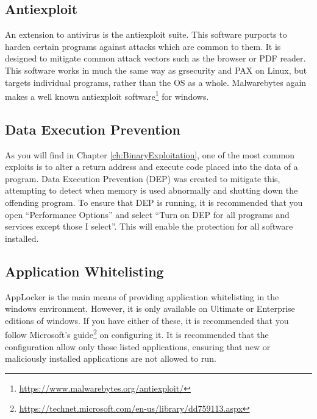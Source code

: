 \documentclass[a4paper,11pt]{report}
\begin{document}
		\subsection{Antiexploit}
			An extension to antivirus is the antiexploit suite. 
			This software purports to harden certain programs against attacks which are common to them. 
			It is designed to mitigate common attack vectors such as the browser or PDF reader. 
			This software works in much the same way as grsecurity and PAX on Linux, but targets individual programs, rather than the OS as a whole. 
			Malwarebytes again makes a well known antiexploit software\footnote{\url{https://www.malwarebytes.org/antiexploit/}} for windows. 
		\subsection{Data Execution Prevention}
			As you will find in Chapter \ref{ch:BinaryExploitation}, 
			one of the most common exploits is to alter a return address and execute code placed into the data of a program. 
			Data Execution Prevention (DEP) was created to mitigate this, attempting to detect when memory is used abnormally and shutting down the offending program. 
			To ensure that DEP is running, it is recommended that you open ``Performance Options'' and select ``Turn on DEP for all programs and services except those I select''. 
			This will enable the protection for all software installed. 
		\subsection{Application Whitelisting}
			AppLocker is the main means of providing application whitelisting in the windows environment. 
			However, it is only available on Ultimate or Enterprise editions of windows. 
			If you have either of these, it is recommended that you follow Microsoft's guide\footnote{\url{https://technet.microsoft.com/en-us/library/dd759113.aspx}} on configuring it. 
			It is recommended that the configuration allow only those listed applications,
			ensuring that new or maliciously installed applications are not allowed to run. 
\end{document}
